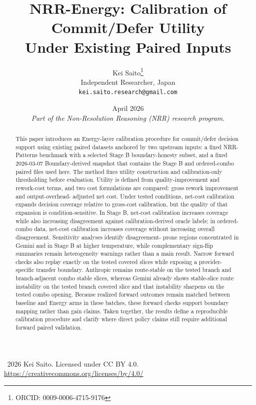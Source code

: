 \documentclass[11pt,a4paper]{article}
\title{\textbf{NRR-Energy: Calibration of Commit/Defer Utility\\Under Existing Paired Inputs}}
\author{
  Kei Saito\thanks{ORCID: 0009-0006-4715-9176} \\
  Independent Researcher, Japan \\
  \texttt{kei.saito.research@gmail.com}
}
\date{April 2026 \\[0.5em]
\textit{Part of the Non-Resolution Reasoning (NRR) research program.}}
\begin{document}
\maketitle

\begin{center}
\textcopyright\ 2026 Kei Saito.
Licensed under CC BY 4.0.\\
\url{https://creativecommons.org/licenses/by/4.0/}
\end{center}

\begin{abstract}
This paper introduces an Energy-layer calibration procedure for commit/defer
decision support using existing paired datasets anchored by two upstream
inputs: a fixed NRR-Patterns benchmark with a selected Stage B
boundary-honesty subset, and a fixed 2026-03-07 Boundary-derived snapshot that
contains the Stage B and ordered-combo paired files used here. The method
fixes utility construction and calibration-only thresholding before evaluation.
Utility is defined from quality-improvement and rework-cost terms, and two cost
formulations are compared: gross rework improvement and output-overhead-
adjusted net cost. Under tested conditions, net-cost calibration expands
decision coverage relative to gross-cost calibration, but the quality of that
expansion is condition-sensitive. In Stage B, net-cost calibration increases
coverage while also increasing disagreement against calibration-derived oracle
labels; in ordered-combo data, net-cost calibration increases coverage without
increasing overall disagreement. Sensitivity analyses identify disagreement-
prone regions concentrated in Gemini and in Stage B at higher temperature,
while complementary sign-flip summaries remain heterogeneity warnings rather
than a main result. Narrow forward checks also replay exactly on the tested
covered slices while exposing a provider-specific transfer boundary. Anthropic
remains route-stable on the tested branch and branch-adjacent combo stable
slices, whereas Gemini already shows stable-slice route instability on the
tested branch covered slice and that instability sharpens on the tested combo
opening. Because realized forward outcomes remain matched between baseline and
Energy arms in these batches, these forward checks support boundary mapping
rather than gain claims. Taken together, the results define a reproducible
calibration procedure and clarify where direct policy claims still require
additional forward paired validation.
\end{abstract}
\end{document}
